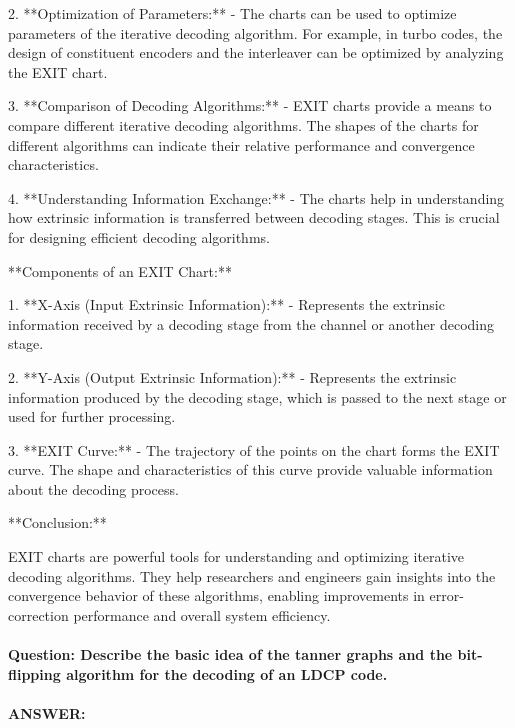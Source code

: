 \documentclass[colorlinks,11pt,a4paper,normalphoto,withhyper,ragged2e]{altareport}
\begin{document}
				2. **Optimization of Parameters:**
				- The charts can be used to optimize parameters of the iterative decoding algorithm. For example, in turbo codes, the design of constituent encoders and the interleaver can be optimized by analyzing the EXIT chart.
				
				3. **Comparison of Decoding Algorithms:**
				- EXIT charts provide a means to compare different iterative decoding algorithms. The shapes of the charts for different algorithms can indicate their relative performance and convergence characteristics.
				
				4. **Understanding Information Exchange:**
				- The charts help in understanding how extrinsic information is transferred between decoding stages. This is crucial for designing efficient decoding algorithms.
				
				**Components of an EXIT Chart:**
				
				1. **X-Axis (Input Extrinsic Information):**
				- Represents the extrinsic information received by a decoding stage from the channel or another decoding stage.
				
				2. **Y-Axis (Output Extrinsic Information):**
				- Represents the extrinsic information produced by the decoding stage, which is passed to the next stage or used for further processing.
				
				3. **EXIT Curve:**
				- The trajectory of the points on the chart forms the EXIT curve. The shape and characteristics of this curve provide valuable information about the decoding process.
				
				**Conclusion:**
				
				EXIT charts are powerful tools for understanding and optimizing iterative decoding algorithms. They help researchers and engineers gain insights into the convergence behavior of these algorithms, enabling improvements in error-correction performance and overall system efficiency.
				
				
				
				
				\paragraph{Question: Describe the basic idea of the tanner graphs and the bit-flipping algorithm for the decoding of an LDCP code.}
				\paragraph{ANSWER:}
				
\end{document}
